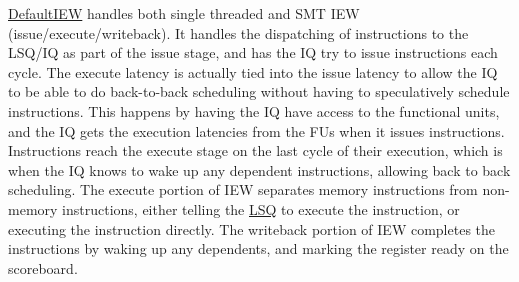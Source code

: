 \hyperlink{classDefaultIEW}{DefaultIEW} handles both single threaded and SMT IEW (issue/execute/writeback). It handles the dispatching of instructions to the LSQ/IQ as part of the issue stage, and has the IQ try to issue instructions each cycle. The execute latency is actually tied into the issue latency to allow the IQ to be able to do back-\/to-\/back scheduling without having to speculatively schedule instructions. This happens by having the IQ have access to the functional units, and the IQ gets the execution latencies from the FUs when it issues instructions. Instructions reach the execute stage on the last cycle of their execution, which is when the IQ knows to wake up any dependent instructions, allowing back to back scheduling. The execute portion of IEW separates memory instructions from non-\/memory instructions, either telling the \hyperlink{classLSQ}{LSQ} to execute the instruction, or executing the instruction directly. The writeback portion of IEW completes the instructions by waking up any dependents, and marking the register ready on the scoreboard. 

